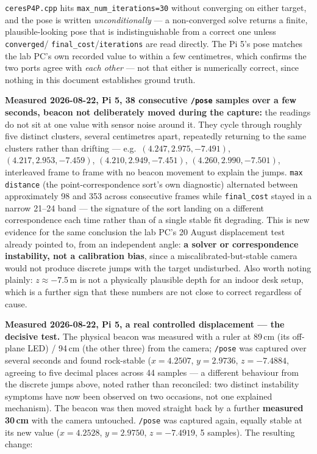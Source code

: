 \documentclass[11pt]{report}
\begin{document}
\texttt{ceresP4P.cpp} hits \texttt{max\_num\_iterations=30} without
converging on either target, and the pose is written \emph{unconditionally}
--- a non-converged solve returns a finite, plausible-looking pose that is
indistinguishable from a correct one unless \texttt{converged}/%
\texttt{final\_cost}/\texttt{iterations} are read directly. The Pi 5's pose
matches the lab PC's own recorded value to within a few centimetres, which
confirms the two ports agree with \emph{each other} --- not that either is
numerically correct, since nothing in this document establishes ground
truth.

\textbf{Measured 2026-08-22, Pi 5, 38 consecutive \texttt{/pose} samples over
a few seconds, beacon not deliberately moved during the capture:} the
readings do not sit at one value with sensor noise around it. They cycle
through roughly five distinct clusters, several centimetres apart,
repeatedly returning to the same clusters rather than drifting --- e.g.\
$(4.247, 2.975, -7.491)$, $(4.217, 2.953, -7.459)$, $(4.210, 2.949, -7.451)$,
$(4.260, 2.990, -7.501)$, interleaved frame to frame with no beacon movement
to explain the jumps. \texttt{max distance} (the point-correspondence sort's
own diagnostic) alternated between approximately 98 and 353 across
consecutive frames while \texttt{final\_cost} stayed in a narrow 21--24 band
--- the signature of the sort landing on a different correspondence each
time rather than of a single stable fit degrading. This is new evidence for
the same conclusion the lab PC's 20 August displacement test already
pointed to, from an independent angle: \textbf{a solver or correspondence
instability, not a calibration bias}, since a miscalibrated-but-stable
camera would not produce discrete jumps with the target undisturbed. Also
worth noting plainly: $z\approx-7.5\,$m is not a physically plausible depth
for an indoor desk setup, which is a further sign that these numbers are not
close to correct regardless of cause.

\textbf{Measured 2026-08-22, Pi 5, a real controlled displacement --- the
decisive test.} The physical beacon was measured with a ruler at
89\,cm (its off-plane LED) / 94\,cm (the other three) from the camera;
\texttt{/pose} was captured over several seconds and found rock-stable
($x{=}4.2507$, $y{=}2.9736$, $z{=}-7.4884$, agreeing to five decimal places
across 44 samples --- a different behaviour from the discrete jumps above,
noted rather than reconciled: two distinct instability symptoms have now
been observed on two occasions, not one explained mechanism). The beacon was
then moved straight back by a further \textbf{measured 30\,cm} with the
camera untouched. \texttt{/pose} was captured again, equally stable at its
new value ($x{=}4.2528$, $y{=}2.9750$, $z{=}-7.4919$, 5 samples). The
resulting change:
\end{document}
